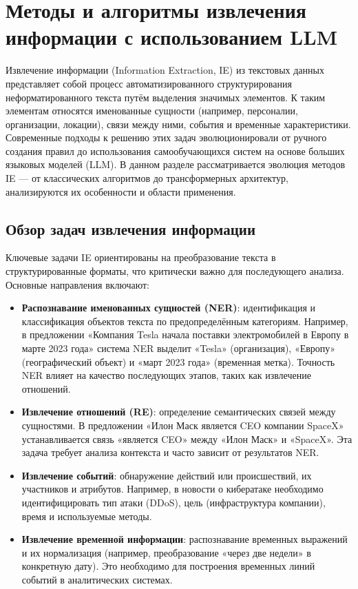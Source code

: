 \section{Методы и алгоритмы извлечения информации с использованием LLM}

Извлечение информации (Information Extraction, IE) из текстовых данных представляет собой процесс автоматизированного структурирования неформатированного текста путём выделения значимых элементов. К таким элементам относятся именованные сущности (например, персоналии, организации, локации), связи между ними, события и временные характеристики. Современные подходы к решению этих задач эволюционировали от ручного создания правил до использования самообучающихся систем на основе больших языковых моделей (LLM). В данном разделе рассматривается эволюция методов IE — от классических алгоритмов до трансформерных архитектур, анализируются их особенности и области применения.

\subsection{Обзор задач извлечения информации}

Ключевые задачи IE ориентированы на преобразование текста в структурированные форматы, что критически важно для последующего анализа. Основные направления включают:

\begin{itemize}
    \item \textbf{Распознавание именованных сущностей (NER)}: идентификация и классификация объектов текста по предопределённым категориям. Например, в предложении «Компания Tesla начала поставки электромобилей в Европу в марте 2023 года» система NER выделит «Tesla» (организация), «Европу» (географический объект) и «март 2023 года» (временная метка). Точность NER влияет на качество последующих этапов, таких как извлечение отношений.

    \item \textbf{Извлечение отношений (RE)}: определение семантических связей между сущностями. В предложении «Илон Маск является CEO компании SpaceX» устанавливается связь «является CEO» между «Илон Маск» и «SpaceX». Эта задача требует анализа контекста и часто зависит от результатов NER.

    \item \textbf{Извлечение событий}: обнаружение действий или происшествий, их участников и атрибутов. Например, в новости о кибератаке необходимо идентифицировать тип атаки (DDoS), цель (инфраструктура компании), время и используемые методы.

    \item \textbf{Извлечение временной информации}: распознавание временных выражений и их нормализация (например, преобразование «через две недели» в конкретную дату). Это необходимо для построения временных линий событий в аналитических системах.
\end{itemize}

